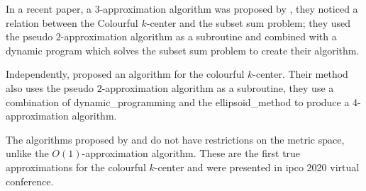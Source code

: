 In a recent paper, a 3-approximation algorithm was proposed by \textcite{jia_fair_2020}, they noticed a relation between the Colourful $k$-center and the subset sum problem; they used the pseudo $2$-approximation algorithm as a subroutine and combined with a dynamic program which solves the subset sum problem to create their algorithm.

Independently, \textcite{anegg_technique_2020} proposed an algorithm for the colourful $k$-center. Their method also uses the pseudo $2$-approximation algorithm as a subroutine, they use a combination of \gls{dynamic_programming} and the \gls{ellipsoid_method} to produce a 4-approximation algorithm.

The algorithms proposed by \textcite{jia_fair_2020} and \textcite{anegg_technique_2020} do not have restrictions on the metric space, unlike the $O(1)$-approximation algorithm. These are the first true approximations for the colourful $k$-center and were presented in \acrshort{ipco} 2020 virtual conference. 